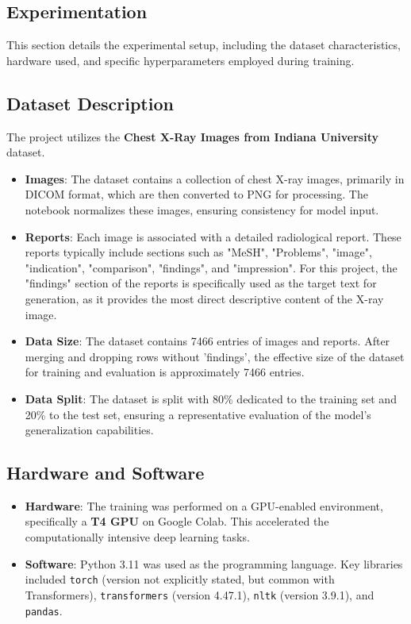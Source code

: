 \documentclass[a4paper, 12pt]{article}
\begin{document}
\begin{itemize}
\section{Experimentation}
\label{sec:experimentation}

This section details the experimental setup, including the dataset characteristics, hardware used, and specific hyperparameters employed during training.

\subsection{Dataset Description}
The project utilizes the \textbf{Chest X-Ray Images from Indiana University} dataset.
\begin{itemize}
    \item \textbf{Images}: The dataset contains a collection of chest X-ray images, primarily in DICOM format, which are then converted to PNG for processing. The notebook normalizes these images, ensuring consistency for model input.
    \item \textbf{Reports}: Each image is associated with a detailed radiological report. These reports typically include sections such as "MeSH", "Problems", "image", "indication", "comparison", "findings", and "impression". For this project, the "findings" section of the reports is specifically used as the target text for generation, as it provides the most direct descriptive content of the X-ray image.
    \item \textbf{Data Size}: The dataset contains 7466 entries of images and reports. After merging and dropping rows without 'findings', the effective size of the dataset for training and evaluation is approximately 7466 entries.
    \item \textbf{Data Split}: The dataset is split with 80\% dedicated to the training set and 20\% to the test set, ensuring a representative evaluation of the model's generalization capabilities.
\end{itemize}

\subsection{Hardware and Software}
\begin{itemize}
    \item \textbf{Hardware}: The training was performed on a GPU-enabled environment, specifically a \textbf{T4 GPU} on Google Colab. This accelerated the computationally intensive deep learning tasks.
    \item \textbf{Software}: Python 3.11 was used as the programming language. Key libraries included \texttt{torch} (version not explicitly stated, but common with Transformers), \texttt{transformers} (version 4.47.1), \texttt{nltk} (version 3.9.1), and \texttt{pandas}.
\end{itemize}


\end{itemize}
\end{document}
